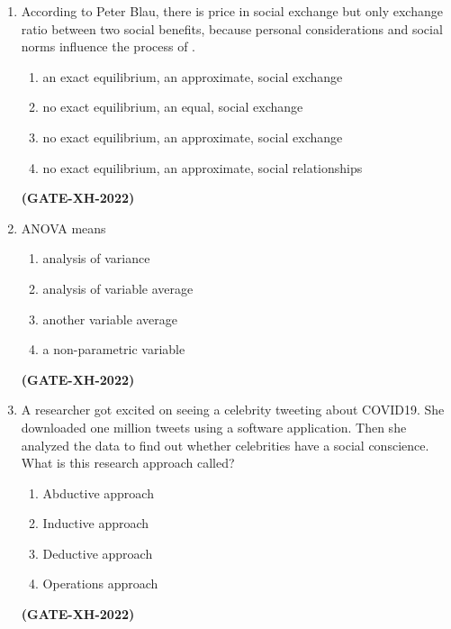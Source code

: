 \documentclass[journal]{IEEEtran}
\begin{document}
\begin{enumerate}
\item
According to Peter Blau, there is \underline{\hspace{1cm}} price in social exchange but only \underline{\hspace{1cm}} exchange ratio between two social benefits, because personal considerations and social norms influence the process of \underline{\hspace{1cm}}.
\begin{enumerate}
\item an exact equilibrium, an approximate, social exchange
\item no exact equilibrium, an equal, social exchange
\item no exact equilibrium, an approximate, social exchange
\item no exact equilibrium, an approximate, social relationships
\end{enumerate}
\hfill\textbf{(GATE-XH-2022)}

\item
ANOVA means
\begin{multicols}{2}
\begin{enumerate}
\item analysis of variance
\item analysis of variable average
\item another variable average
\item a non-parametric variable
\end{enumerate}
\end{multicols}
\hfill\textbf{(GATE-XH-2022)}

\item
A researcher got excited on seeing a celebrity tweeting about COVID19. She downloaded one million tweets using a software application. Then she analyzed the data to find out whether celebrities have a social conscience. What is this research approach called?
\begin{multicols}{2}
\begin{enumerate}
\item Abductive approach
\item Inductive approach
\item Deductive approach
\item Operations approach
\end{enumerate}
\end{multicols}
\hfill\textbf{(GATE-XH-2022)}


\end{enumerate}
\end{document}
